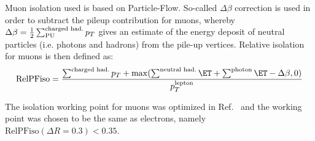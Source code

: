 Muon isolation used is based on Particle-Flow.
So-called $\Delta\beta$ correction is used in order to subtract the pileup contribution for muons, 
whereby $\Delta\beta = \frac{1}{2} \sum^\text{charged had.}_\text{PU} p_T$  gives an estimate of the energy deposit of neutral particles (i.e. photons and hadrons) from the pile-up vertices. 
Relative isolation for muons is then defined as:
\begin{equation}
\text{RelPFiso} = \frac{\sum^\text{charged had.} \pt + \max(\sum^\text{neutral had.} \ET 
+ \sum^\text{photon} \ET - \Delta \beta, 0)}{\pt^\text{lepton}}
\label{eqn:mupfiso}
\end{equation}

The isolation working point for muons was optimized in Ref.~\cite{AN-15-277} and the working point was chosen to be the same as electrons,
namely $\text{RelPFiso}(\Delta R = 0.3) < 0.35$. 

